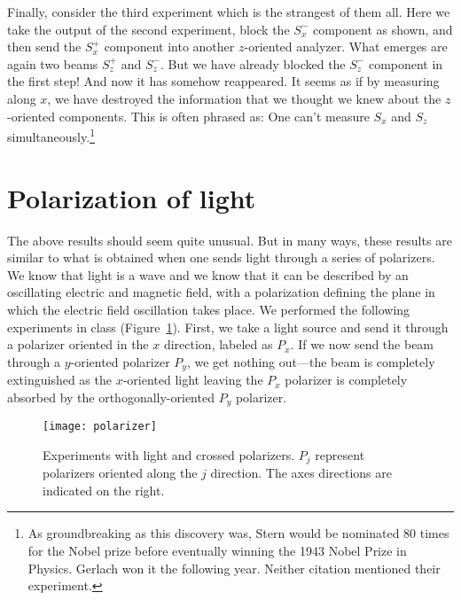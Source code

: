 Finally, consider the third experiment which is the strangest of them all. Here we take the output of the second experiment, block the $S_x^-$ component as shown, and then send the $S_x^+$ component into another $z$-oriented analyzer. What emerges are again two beams $S_z^+$ and $S_z^-$. But we have already blocked the $S_z^-$ component in the first step! And now it has somehow reappeared. It seems as if by measuring along $x$, we have destroyed the information that we thought we knew about the $z$-oriented components. This is often phrased as: One can't measure $S_x$ and $S_z$ simultaneously.\footnote{As groundbreaking as this discovery was, Stern would be nominated 80 times for the Nobel prize before eventually winning the 1943 Nobel Prize in Physics. Gerlach won it the following year. Neither citation mentioned their experiment.} \par


\section{Polarization of light}
The above results should seem quite unusual. But in many ways, these results are similar to what is obtained when one sends light through a series of polarizers. We know that light is a wave and we know that it can be described by an oscillating electric and magnetic field, with a polarization defining the plane in which the electric field oscillation takes place. We performed the following experiments in class (Figure~\ref{fig:polarizer}). First, we take a light source and send it through a polarizer oriented in the $x$ direction, labeled as $P_x$. If we now send the beam through a $y$-oriented polarizer $P_y$, we get nothing out---the beam is completely extinguished as the $x$-oriented light leaving the $P_x$ polarizer is completely absorbed by the orthogonally-oriented $P_y$ polarizer. \par

\begin{figure}[!h]
	\centering
	\texttt{[image: polarizer]}
	\caption{Experiments with light and crossed polarizers. $P_j$ represent polarizers oriented along the $j$ direction. The axes directions are indicated on the right.}
	\label{fig:polarizer}
\end{figure}


